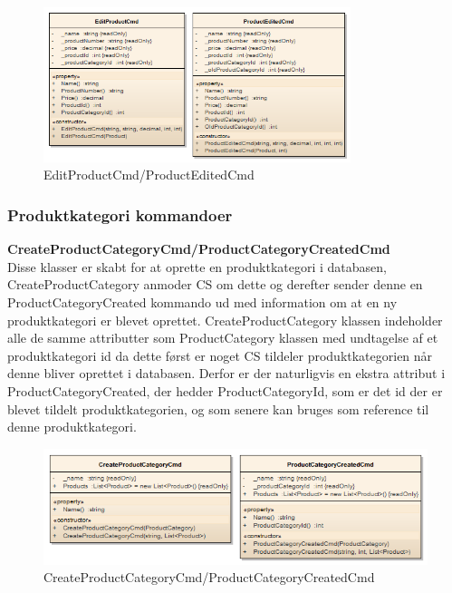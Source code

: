 \begin{figure}[H]
    \centering
    \includegraphics[width=0.8\textwidth]{Systemdesign/SharedLib/Images/Klasser/Command/Product/EditPrd.png}
    \caption{EditProductCmd/ProductEditedCmd}
    \label{fig:klasseCMDDeletePrd}
\end{figure}

\subsubsection*{Produktkategori kommandoer}

\textbf{CreateProductCategoryCmd/ProductCategoryCreatedCmd}\\
Disse klasser er skabt for at oprette en produktkategori i databasen, CreateProductCategory anmoder \gls{CS} om dette og derefter sender denne en ProductCategoryCreated kommando ud med information om at en ny produktkategori er blevet oprettet. CreateProductCategory klassen indeholder alle de samme attributter som ProductCategory klassen med undtagelse af et produktkategori id da dette først er noget \gls{CS} tildeler produktkategorien når denne bliver oprettet i databasen. Derfor er der naturligvis en ekstra attribut i ProductCategoryCreated, der hedder ProductCategoryId, som er det id der er blevet tildelt produktkategorien, og som senere kan bruges som reference til denne produktkategori. 

\begin{figure}[H]
    \centering
    \includegraphics[width=1.0\textwidth]{Systemdesign/SharedLib/Images/Klasser/Command/ProductCategory/CreatePrdCtg.png}
    \caption{CreateProductCategoryCmd/ProductCategoryCreatedCmd}
    \label{fig:klasseCMDCreatePrdCtg}
\end{figure}

